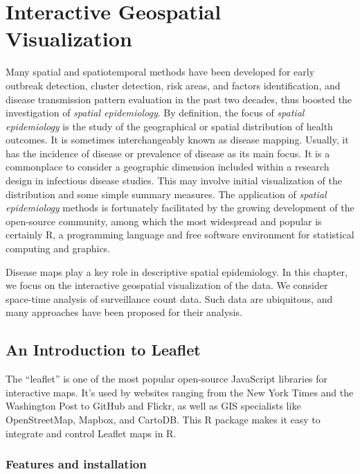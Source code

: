 \documentclass[]{book}
\begin{document}
\chapter{Interactive Geospatial Visualization}\label{map}

Many spatial and spatiotemporal methods have been developed for early
outbreak detection, cluster detection, risk areas, and factors
identification, and disease transmission pattern evaluation in the past
two decades, thus boosted the investigation of \emph{spatial
epidemiology}. By definition, the focus of \emph{spatial epidemiology}
is the study of the geographical or spatial distribution of health
outcomes. It is sometimes interchangeably known as disease mapping.
Usually, it has the incidence of disease or prevalence of disease as its
main focus. It is a commonplace to consider a geographic dimension
included within a research design in infectious disease studies. This
may involve initial visualization of the distribution and some simple
summary measures. The application of \emph{spatial epidemiology} methods
is fortunately facilitated by the growing development of the open-source
community, among which the most widespread and popular is certainly R, a
programming language and free software environment for statistical
computing and graphics.

Disease maps play a key role in descriptive spatial epidemiology. In
this chapter, we focus on the interactive geospatial visualization of
the data. We consider space-time analysis of surveillance count data.
Such data are ubiquitous, and many approaches have been proposed for
their analysis.

\section{An Introduction to Leaflet}\label{an-introduction-to-leaflet}

The ``leaflet'' is one of the most popular open-source JavaScript
libraries for interactive maps. It's used by websites ranging from the
New York Times and the Washington Post to GitHub and Flickr, as well as
GIS specialists like OpenStreetMap, Mapbox, and CartoDB. This R package
makes it easy to integrate and control Leaflet maps in R.

\subsection{Features and installation}\label{features-and-installation}
\end{document}
